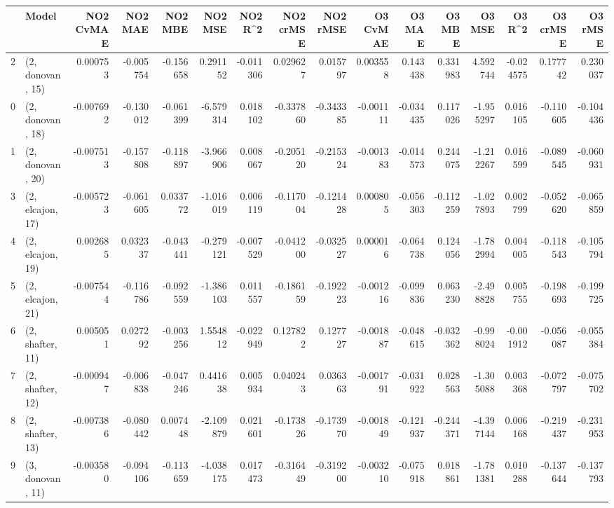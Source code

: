 \begin{tabular}{llrrrrrrrrrrrrrr}
\toprule
{} &             Model &  NO2 CvMAE &   NO2 MAE &   NO2 MBE &    NO2 MSE &   NO2 R\textasciicircum2 &  NO2 crMSE &  NO2 rMSE &  O3 CvMAE &    O3 MAE &    O3 MBE &     O3 MSE &    O3 R\textasciicircum2 &  O3 crMSE &   O3 rMSE \\
\midrule
2  &  (2, donovan, 15) &   0.000753 & -0.005754 & -0.156658 &   0.291152 & -0.011306 &   0.029627 &  0.015797 &  0.003558 &  0.143438 &  0.331983 &   4.592744 & -0.024575 &  0.177742 &  0.230037 \\
0  &  (2, donovan, 18) &  -0.007692 & -0.130012 & -0.061399 &  -6.579314 &  0.018102 &  -0.337860 & -0.343385 & -0.001111 & -0.034435 &  0.117026 &  -1.955297 &  0.016105 & -0.110605 & -0.104436 \\
1  &  (2, donovan, 20) &  -0.007513 & -0.157808 & -0.118897 &  -3.966906 &  0.008067 &  -0.205120 & -0.215324 & -0.001383 & -0.014573 &  0.244075 &  -1.212267 &  0.016599 & -0.089545 & -0.060931 \\
3  &  (2, elcajon, 17) &  -0.005723 & -0.061605 &  0.033772 &  -1.016019 &  0.006119 &  -0.117004 & -0.121428 &  0.000805 & -0.056303 & -0.112259 &  -1.027893 &  0.002799 & -0.052620 & -0.065859 \\
4  &  (2, elcajon, 19) &   0.002685 &  0.032337 & -0.043441 &  -0.279121 & -0.007529 &  -0.041200 & -0.032527 &  0.000016 & -0.064738 &  0.124056 &  -1.782994 &  0.004005 & -0.118543 & -0.105794 \\
5  &  (2, elcajon, 21) &  -0.007544 & -0.116786 & -0.092559 &  -1.386103 &  0.011557 &  -0.186159 & -0.192223 & -0.001216 & -0.099836 &  0.063230 &  -2.498828 &  0.005755 & -0.198693 & -0.199725 \\
6  &  (2, shafter, 11) &   0.005051 &  0.027292 & -0.003256 &   1.554812 & -0.022949 &   0.127822 &  0.127727 & -0.001887 & -0.048615 & -0.032362 &  -0.998024 & -0.001912 & -0.056087 & -0.055384 \\
7  &  (2, shafter, 12) &  -0.000947 & -0.006838 & -0.047246 &   0.441638 &  0.005934 &   0.040243 &  0.036363 & -0.001791 & -0.031922 &  0.028563 &  -1.305088 &  0.003368 & -0.072797 & -0.075702 \\
8  &  (2, shafter, 13) &  -0.007386 & -0.080442 &  0.007448 &  -2.109879 &  0.021601 &  -0.173826 & -0.173970 & -0.001849 & -0.121937 & -0.244371 &  -4.397144 &  0.006168 & -0.219437 & -0.231953 \\
9  &  (3, donovan, 11) &  -0.003580 & -0.094106 & -0.113659 &  -4.038175 &  0.017473 &  -0.316449 & -0.319200 & -0.003210 & -0.075918 &  0.018861 &  -1.781381 &  0.010288 & -0.137644 & -0.137793 \\

\end{tabular}
